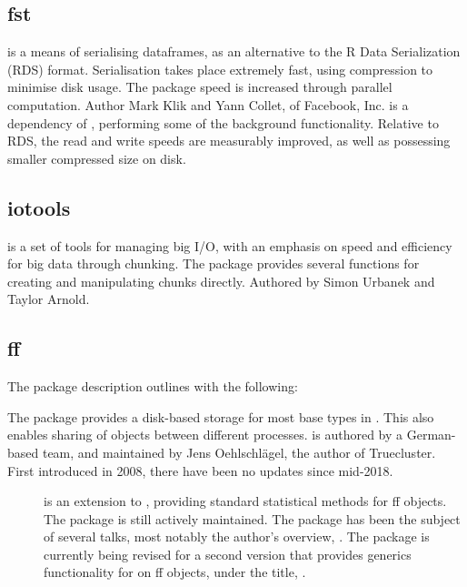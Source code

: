 \subsection{fst}\label{sec:fst}

 is a means of serialising dataframes, as an alternative to the R Data Serialization (RDS) format\cite{klik2022fst}.
Serialisation takes place extremely fast, using compression to minimise disk usage.
The package speed is increased through parallel computation.
Author Mark Klik and Yann Collet, of Facebook, Inc.
 is a dependency of , performing some of the
background functionality.
Relative to RDS, the read and write speeds are measurably improved, as well as possessing smaller compressed size on disk.

\subsection{iotools}\label{subsec:iotools}

 is a set of tools for managing big I/O, with an emphasis on
speed and efficiency for big data through chunking\cite{urbanek20b}.
The package provides several functions for creating and manipulating chunks directly.
Authored by Simon Urbanek and Taylor Arnold.

\subsection{ff}\label{subsec:ff}

The package description outlines  with the following:


The package provides a disk-based storage for most base types in \R{}.
This also enables sharing of objects between different \R{} processes.
 is
authored by a German-based team, and maintained by Jens Oehlschlägel,
the author of Truecluster\cite{oehlschlägel2007trueclusterrobustscalableclustering}.
First introduced in 2008\cite{adler08:_large_r}, there have been no updates since mid-2018.

\begin{description}
	\item[\cite{jonge20}]
		is an extension to , providing standard statistical methods for ff
		objects.
		The package is still actively maintained.
		The package has been the subject of several talks, most notably the author's overview, \cite{wijffels13}.
		The package is currently being revised for a second version that provides generics functionality for  on ff objects, under the title, \cite{jonge15}.
\end{description}
